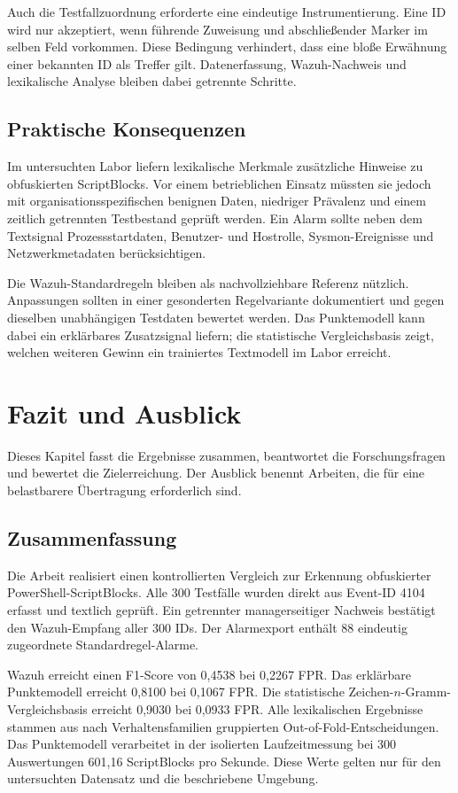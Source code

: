 \documentclass[12pt,a4paper,oneside,parskip=half]{scrreprt}
\begin{document}
Auch die Testfallzuordnung erforderte eine eindeutige Instrumentierung. Eine ID wird nur akzeptiert, wenn führende Zuweisung und abschließender Marker im selben Feld vorkommen. Diese Bedingung verhindert, dass eine bloße Erwähnung einer bekannten ID als Treffer gilt. Datenerfassung, Wazuh-Nachweis und lexikalische Analyse bleiben dabei getrennte Schritte.

\section{Praktische Konsequenzen}
Im untersuchten Labor liefern lexikalische Merkmale zusätzliche Hinweise zu obfuskierten ScriptBlocks. Vor einem betrieblichen Einsatz müssten sie jedoch mit organisationsspezifischen benignen Daten, niedriger Prävalenz und einem zeitlich getrennten Testbestand geprüft werden. Ein Alarm sollte neben dem Textsignal Prozessstartdaten, Benutzer- und Hostrolle, Sysmon-Ereignisse und Netzwerkmetadaten berücksichtigen.

Die Wazuh-Standardregeln bleiben als nachvollziehbare Referenz nützlich. Anpassungen sollten in einer gesonderten Regelvariante dokumentiert und gegen dieselben unabhängigen Testdaten bewertet werden. Das Punktemodell kann dabei ein erklärbares Zusatzsignal liefern; die statistische Vergleichsbasis zeigt, welchen weiteren Gewinn ein trainiertes Textmodell im Labor erreicht.
\chapter{Fazit und Ausblick}

Dieses Kapitel fasst die Ergebnisse zusammen, beantwortet die Forschungsfragen und bewertet die Zielerreichung. Der Ausblick benennt Arbeiten, die für eine belastbarere Übertragung erforderlich sind.

\section{Zusammenfassung}
Die Arbeit realisiert einen kontrollierten Vergleich zur Erkennung obfuskierter PowerShell-ScriptBlocks. Alle 300 Testfälle wurden direkt aus Event-ID 4104 erfasst und textlich geprüft. Ein getrennter managerseitiger Nachweis bestätigt den Wazuh-Empfang aller 300 IDs. Der Alarmexport enthält 88 eindeutig zugeordnete Standardregel-Alarme.

Wazuh erreicht einen F1-Score von 0{,}4538 bei 0{,}2267 FPR. Das erklärbare Punktemodell erreicht 0{,}8100 bei 0{,}1067 FPR. Die statistische Zeichen-\(n\)-Gramm-Vergleichsbasis erreicht 0{,}9030 bei 0{,}0933 FPR. Alle lexikalischen Ergebnisse stammen aus nach Verhaltensfamilien gruppierten Out-of-Fold-Entscheidungen. Das Punktemodell verarbeitet in der isolierten Laufzeitmessung bei 300 Auswertungen 601{,}16 ScriptBlocks pro Sekunde. Diese Werte gelten nur für den untersuchten Datensatz und die beschriebene Umgebung.
\end{document}
